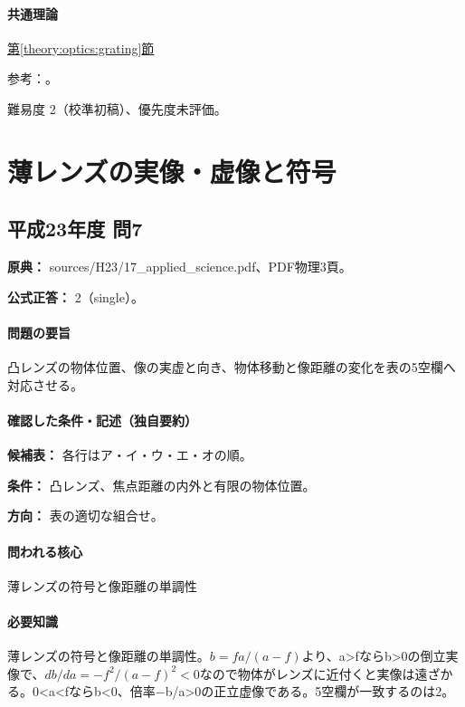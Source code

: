 \paragraph{共通理論} \hyperref[theory:optics:grating]{第\ref*{theory:optics:grating}節}

\par 参考：\cite{os_grating}。

\par 難易度 2（校準初稿）、優先度未評価。

\section{薄レンズの実像・虚像と符号}

\subsection{平成23年度 問7}
\label{q:h23-reg-applied-07}

\noindent\textbf{原典：} sources/H23/17\_applied\_science.pdf、PDF物理3頁。

\textbf{公式正答：} 2（single）。

\paragraph{問題の要旨} 凸レンズの物体位置、像の実虚と向き、物体移動と像距離の変化を表の5空欄へ対応させる。

\paragraph{確認した条件・記述（独自要約）}\mbox{}\par

\noindent\textbf{候補表：} 各行はア・イ・ウ・エ・オの順。\par

\noindent\textbf{条件：} 凸レンズ、焦点距離の内外と有限の物体位置。\par

\noindent\textbf{方向：} 表の適切な組合せ。\par

\paragraph{問われる核心} 薄レンズの符号と像距離の単調性

\paragraph{必要知識} 薄レンズの符号と像距離の単調性。\(b=fa/(a-f)\)より、a>fならb>0の倒立実像で、\(db/da=-f^2/(a-f)^2<0\)なので物体がレンズに近付くと実像は遠ざかる。0<a<fならb<0、倍率−b/a>0の正立虚像である。5空欄が一致するのは2。

